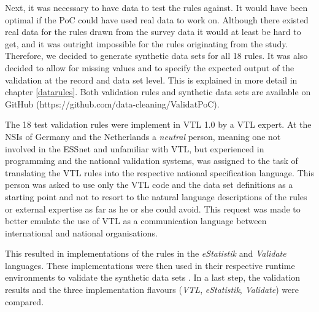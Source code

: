 Next, it was necessary to have data to test the rules against. It would have been
optimal if the PoC could have used real data to work on. Although there existed real
data for the rules drawn from the survey data it would at least be hard to get, and
it was outright impossible for the rules originating from the study. Therefore, we
decided to generate synthetic data sets for all 18 rules. It was also decided to
allow for missing values and to specify the expected output of the validation at the
record and data set level. This is explained in more detail in chapter \ref{datarules}.
Both validation rules and synthetic data sets are available on GitHub
(https://github.com/data-cleaning/ValidatPoC).

The 18 test validation rules were implement in VTL 1.0 by a VTL expert. At the
NSIs of Germany and the Netherlands a \textit{neutral} person, meaning one not
involved in the ESSnet and unfamiliar with VTL, but experienced in programming
and the national validation systems, was assigned to the task of translating
the VTL rules into the respective national specification language. This person
was asked to use only the VTL code and the data set definitions as a starting
point and not to resort to the natural language descriptions of the rules or
external expertise as far as he or she could avoid. This request was made to
better emulate the use of VTL as a communication language between international
and national organisations.

This resulted in implementations of the rules in the \textit{eStatistik} and
\textit{Validate} languages. These implementations were then used in their
respective runtime environments to validate the synthetic data sets . In a last
step, the validation results and the three implementation flavours (\textit{VTL},
\textit{eStatistik}, \textit{Validate}) were compared.

